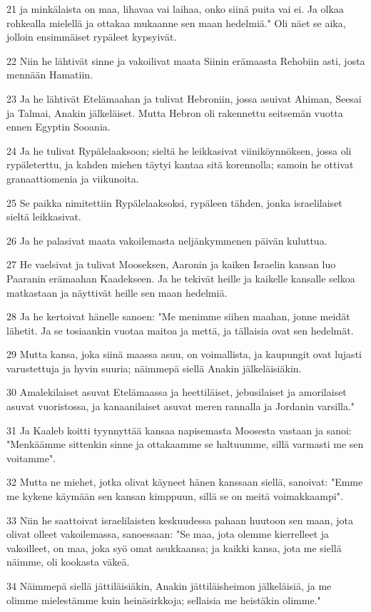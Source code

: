 \par 21 ja minkälaista on maa, lihavaa vai laihaa, onko siinä puita vai ei. Ja olkaa rohkealla mielellä ja ottakaa mukaanne sen maan hedelmiä." Oli näet se aika, jolloin ensimmäiset rypäleet kypsyivät.
\par 22 Niin he lähtivät sinne ja vakoilivat maata Siinin erämaasta Rehobiin asti, josta mennään Hamatiin.
\par 23 Ja he lähtivät Etelämaahan ja tulivat Hebroniin, jossa asuivat Ahiman, Seesai ja Talmai, Anakin jälkeläiset. Mutta Hebron oli rakennettu seitsemän vuotta ennen Egyptin Sooania.
\par 24 Ja he tulivat Rypälelaaksoon; sieltä he leikkasivat viiniköynnöksen, jossa oli rypäleterttu, ja kahden miehen täytyi kantaa sitä korennolla; samoin he ottivat granaattiomenia ja viikunoita.
\par 25 Se paikka nimitettiin Rypälelaaksoksi, rypäleen tähden, jonka israelilaiset sieltä leikkasivat.
\par 26 Ja he palasivat maata vakoilemasta neljänkymmenen päivän kuluttua.
\par 27 He vaelsivat ja tulivat Mooseksen, Aaronin ja kaiken Israelin kansan luo Paaranin erämaahan Kaadekseen. Ja he tekivät heille ja kaikelle kansalle selkoa matkastaan ja näyttivät heille sen maan hedelmiä.
\par 28 Ja he kertoivat hänelle sanoen: "Me menimme siihen maahan, jonne meidät lähetit. Ja se tosiaankin vuotaa maitoa ja mettä, ja tällaisia ovat sen hedelmät.
\par 29 Mutta kansa, joka siinä maassa asuu, on voimallista, ja kaupungit ovat lujasti varustettuja ja hyvin suuria; näimmepä siellä Anakin jälkeläisiäkin.
\par 30 Amalekilaiset asuvat Etelämaassa ja heettiläiset, jebusilaiset ja amorilaiset asuvat vuoristossa, ja kanaanilaiset asuvat meren rannalla ja Jordanin varsilla."
\par 31 Ja Kaaleb koitti tyynnyttää kansaa napisemasta Moosesta vastaan ja sanoi: "Menkäämme sittenkin sinne ja ottakaamme se haltuumme, sillä varmasti me sen voitamme".
\par 32 Mutta ne miehet, jotka olivat käyneet hänen kanssaan siellä, sanoivat: "Emme me kykene käymään sen kansan kimppuun, sillä se on meitä voimakkaampi".
\par 33 Niin he saattoivat israelilaisten keskuudessa pahaan huutoon sen maan, jota olivat olleet vakoilemassa, sanoessaan: "Se maa, jota olemme kierrelleet ja vakoilleet, on maa, joka syö omat asukkaansa; ja kaikki kansa, jota me siellä näimme, oli kookasta väkeä.
\par 34 Näimmepä siellä jättiläisiäkin, Anakin jättiläisheimon jälkeläisiä, ja me olimme mielestämme kuin heinäsirkkoja; sellaisia me heistäkin olimme."

